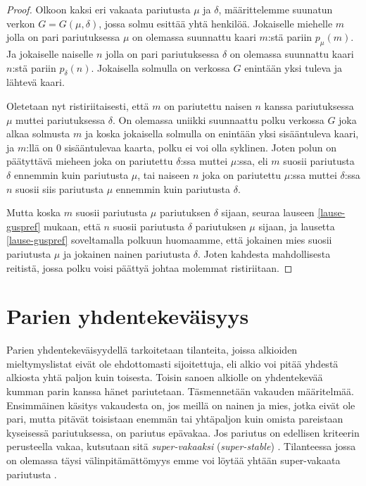 \documentclass[finnish]{tktltiki2}
\theoremstyle{definition}
\theoremstyle{remark}
\begin{document}
\begin{proof}\cite[p. 27]{gusfield1989stable}
Olkoon kaksi eri vakaata pariutusta $\mu$ ja $\delta$, määrittelemme suunatun verkon $G = G(\mu, \delta)$, jossa solmu esittää yhtä henkilöä. Jokaiselle miehelle $m$ jolla on pari pariutuksessa $\mu$ on olemassa suunnattu kaari $m$:stä pariin $p_{\mu}(m)$. Ja jokaiselle naiselle $n$ jolla on pari pariutuksessa $\delta$ on olemassa suunnattu kaari $n$:stä pariin $p_{\delta}(n)$.
Jokaisella solmulla on verkossa $G$ enintään yksi tuleva ja lähtevä kaari.

Oletetaan nyt ristiriitaisesti, että $m$ on pariutettu naisen $n$ kanssa pariutuksessa $\mu$ muttei pariutuksessa $\delta$. On olemassa uniikki suunnaattu polku verkossa $G$ joka alkaa solmusta $m$ ja koska jokaisella solmulla on enintään yksi sisääntuleva kaari, ja $m$:llä on 0 sisääntulevaa kaarta, polku ei voi olla syklinen. Joten polun on päätyttävä mieheen joka on pariutettu $\delta$:ssa muttei $\mu$:ssa, eli $m$ suosii pariutusta $\delta$ ennemmin kuin pariutusta $\mu$, tai naiseen $n$ joka on pariutettu $\mu$:ssa muttei $\delta$:ssa $n$ suosii siis pariutusta $\mu$ ennemmin kuin pariutusta $\delta$.

Mutta koska $m$ suosii pariutusta $\mu$ pariutuksen $\delta$ sijaan, seuraa lauseen \ref{lause-guspref} mukaan, että $n$ suosii pariutusta $\delta$ pariutuksen $\mu$ sijaan, ja lausetta \ref{lause-guspref} soveltamalla polkuun huomaamme, että jokainen mies suosii pariutusta $\mu$ ja jokainen nainen pariutusta $\delta$. Joten kahdesta mahdollisesta reitistä, jossa polku voisi päättyä johtaa molemmat ristiriitaan.
\end{proof}

\section{Parien yhdentekeväisyys}
Parien yhdentekeväisyydellä tarkoitetaan tilanteita, joissa alkioiden mieltymyslistat eivät ole ehdottomasti sijoitettuja, eli alkio voi pitää yhdestä alkiosta yhtä paljon kuin toisesta. Toisin sanoen alkiolle on yhdentekevää kumman parin kanssa hänet pariutetaan. Täsmennetään vakauden määritelmää. Ensimmäinen käsitys vakaudesta on, jos meillä on nainen ja mies, jotka eivät ole pari, mutta pitävät toisistaan enemmän tai yhtäpaljon kuin omista pareistaan kyseisessä pariutuksessa, on pariutus epävakaa. Jos pariutus on edellisen kriteerin perusteella vakaa, kutsutaan sitä \emph{super-vakaaksi} (\emph{super-stable}) \cite{gusfield1989stable}. Tilanteessa jossa on olemassa täysi välinpitämättömyys emme voi löytää yhtään super-vakaata pariutusta \cite[s. 29]{gusfield1989stable}.
\end{document}
